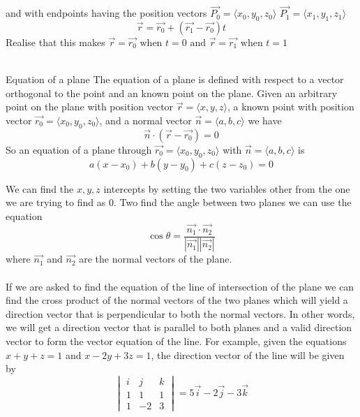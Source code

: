 \documentclass{article}
\begin{document}
	and with endpoints having the position vectors
	$\vec{P_0}= \langle x_{0},y_{0},z_{0} \rangle$ 
	$\vec{P_1}= \langle x_{1},y_{1},z_{1} \rangle$ \\
	\[
		\vec{r}= \vec{r_0}+ (\vec{r_1}-\vec{r_0})t
	\]
	Realise that this makes
	$\vec{r}= \vec{r_0}\text{ when }t = 0 \text{ and }\vec{r}= \vec{r_1}\text{ when
	}t = 1$
	\\ \\
	\begin{mybox}
		{Equation of a plane} The equation of a plane is defined with respect to a vector
		orthogonal to the point and an known point on the plane. Given an arbitrary
		point on the plane with position vector $\vec{r}= \langle x,y,z \rangle$, a known
		point with position vector $\vec{r_0}= \langle x_{0},y_{0},z_{0} \rangle$,
		and a normal vector $\vec{n}= \langle a,b,c \rangle$ we have
		\[
			\vec{n}\cdot (\vec{r}-\vec{r_0}) = 0
		\]
		So an equation of a plane through
		$\vec{r_0}= \langle x_{0},y_{0},z_{0} \rangle$ with
		$\vec{n}= \langle a,b,c \rangle$ is
		\[
			a(x-x_{0})+b(y-y_{0})+c(z-z_{0}) = 0
		\]
	\end{mybox}
	We can find the $x,y,z$ intercepts by setting the two variables other from the
	one we are trying to find as 0. Two find the angle between two planes we can
	use the equation
	\[
		\cos{\theta}= \frac{\vec{n_1} \cdot \vec{n_2} }{|\vec{n_1}||\vec{n_2}|}
	\]
	where $\vec{n_1}$ and $\vec{n_2}$ are the normal vectors of the plane. \\ \\ If
	we are asked to find the equation of the line of intersection of the plane we can
	find the cross product of the normal vectors of the two planes which will yield
	a direction vector that is perpendicular to both the normal vectors. In other
	words, we will get a direction vector that is parallel to both planes and a valid
	direction vector to form the vector equation of the line. For example, given the
	equations $x+y+z =1$ and $x-2y+3z=1$, the direction vector of the line will be
	given by
	\[
		\begin{vmatrix}
			i & j  & k \\
			1 & 1  & 1 \\
			1 & -2 & 3
		\end{vmatrix}
		= 5\vec{i}- 2\vec{j}- 3\vec{k}
	\]
\end{document}
